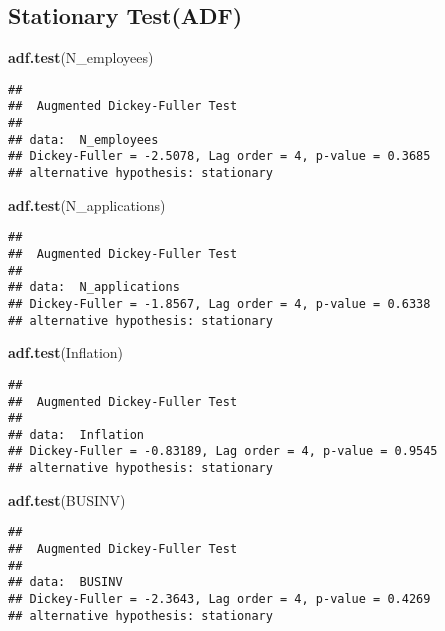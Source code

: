 \documentclass[
]{article}
\newenvironment{Shaded}{\begin{snugshade}}{\end{snugshade}}
\newcommand{\FunctionTok}[1]{\textcolor[rgb]{0.13,0.29,0.53}{\textbf{#1}}}
\newcommand{\NormalTok}[1]{#1}
\begin{document}
\subsection{Stationary Test(ADF)}\label{stationary-testadf}

\begin{Shaded}
\begin{Highlighting}[]
\FunctionTok{adf.test}\NormalTok{(N\_employees)}
\end{Highlighting}
\end{Shaded}

\begin{verbatim}
## 
##  Augmented Dickey-Fuller Test
## 
## data:  N_employees
## Dickey-Fuller = -2.5078, Lag order = 4, p-value = 0.3685
## alternative hypothesis: stationary
\end{verbatim}

\begin{Shaded}
\begin{Highlighting}[]
\FunctionTok{adf.test}\NormalTok{(N\_applications)}
\end{Highlighting}
\end{Shaded}

\begin{verbatim}
## 
##  Augmented Dickey-Fuller Test
## 
## data:  N_applications
## Dickey-Fuller = -1.8567, Lag order = 4, p-value = 0.6338
## alternative hypothesis: stationary
\end{verbatim}

\begin{Shaded}
\begin{Highlighting}[]
\FunctionTok{adf.test}\NormalTok{(Inflation)}
\end{Highlighting}
\end{Shaded}

\begin{verbatim}
## 
##  Augmented Dickey-Fuller Test
## 
## data:  Inflation
## Dickey-Fuller = -0.83189, Lag order = 4, p-value = 0.9545
## alternative hypothesis: stationary
\end{verbatim}

\begin{Shaded}
\begin{Highlighting}[]
\FunctionTok{adf.test}\NormalTok{(BUSINV)}
\end{Highlighting}
\end{Shaded}

\begin{verbatim}
## 
##  Augmented Dickey-Fuller Test
## 
## data:  BUSINV
## Dickey-Fuller = -2.3643, Lag order = 4, p-value = 0.4269
## alternative hypothesis: stationary
\end{verbatim}
\end{document}
